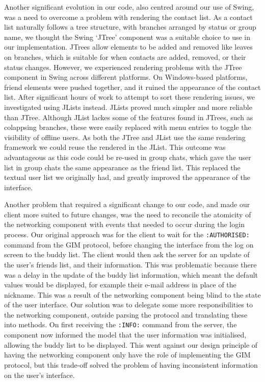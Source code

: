 Another significant evolution in our code, also centred around our use of Swing, was a need to overcome a problem with rendering the contact list. As a contact list naturally follows a tree structure, with branches arranged by status or group name, we thought the Swing `JTree' component was a suitable choice to use in our implementation. JTrees allow elements to be added and removed like leaves on branches, which is suitable for when contacts are added, removed, or their status changes. However, we experienced rendering problems with the JTree component in Swing across different platforms. On Windows-based platforms, friend elements were pushed together, and it ruined the appearance of the contact list. After significant hours of work to attempt to sort these rendering issues, we investigated using JLists instead. JLists proved much simpler and more reliable than JTree. Although JList lackes some of the features found in JTrees, such as colappsing branches, these were easily replaced with menu entries to toggle the visibility of offline users. As both the JTree and JList use the same rendering framework we could reuse the rendered in the JList. This outcome was advantageous as this code could be re-used in group chats, which gave the user list in group chats the same appearance as the friend list. This replaced the textual user list we originally had, and greatly improved the appearance of the interface.  

Another problem that required a significant change to our code, and made our client more suited to future changes, was the need to reconcile the atomicity of the networking component with events that needed to occur during the login process. Our original approach was for the client to wait for the \texttt{:AUTHORISED:} command from the GIM protocol, before changing the interface from the log on screen to the buddy list. The client would then ask the server for an update of the user's friends list, and their information. This was problematic because there was a delay in the update of the buddy list information, which meant the default values would be displayed, for example their e-mail address in place of the nickname. This was a result of the networking component being blind to the state of the user interface. Our solution was to delegate some more responsibilities to the networking  component, outside parsing the protocol and translating these into methods. On first receiving the \texttt{:INFO:} command from the server, the component now informed the model that the user information was initialised, allowing the buddy list to be displayed. This went against our design principle of having the networking component only have the role of implementing the GIM protocol, but this trade-off solved the problem of having inconsistent information on the user's interface. 
